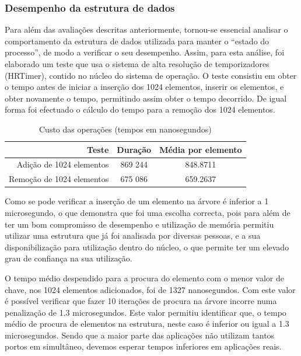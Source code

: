 \documentclass[a4paper]{llncs}
\begin{document}
\subsubsection{Desempenho da estrutura de dados}
Para além das avaliações descritas anteriormente, tornou-se essencial analisar o comportamento da estrutura de dados utilizada para manter o “estado do processo”, de modo a verificar o seu desempenho. 
Assim, para esta análise, foi elaborado um teste que usa o sistema de alta resolução de temporizadores (HRTimer), contido no núcleo do sistema de operação.
O teste consistiu em obter o tempo antes de iniciar a inserção dos 1024 elementos, inserir os elementos, e obter novamente o tempo, permitindo assim obter o tempo decorrido. De igual forma foi efectuado o cálculo do tempo para a remoção dos 1024 elementos.

\begin{table}
\begin{center}

\begin{tabular}{ | r | c | c | }
\hline
\hspace{1cm} Teste \hspace{1.5cm} & \hspace{1cm}Duração\hspace{1cm} &  Média por
elemento \\
\hline
Adição de 1024 elementos & 869 244 & 848.8711 \\
\hline
Remoção de 1024 elementos & 675 086 & 659.2637\\
\hline

\hline
\end{tabular}
\caption{Custo das operações (tempos em nanosegundos)}
\label{tab:tree_info}
\end{center}
\end{table}

Como se pode verificar a inserção de um elemento na árvore é inferior a 1 microsegundo, o que demonstra que foi uma escolha correcta, pois para além de ter um bom compromisso de desempenho e utilização de memória permitiu utilizar uma estrutura que já foi analisada por diversas pessoas, e a sua disponibilização para utilização dentro do núcleo, o que permite ter um elevado grau de confiança na sua utilização.

O tempo médio despendido para a procura do elemento com o menor valor de chave, nos 1024 elementos adicionados, foi de 1327 nanosegundos.
 Com este valor é possível verificar que fazer 10 iterações de procura na árvore incorre numa penalização de 1.3 microsegundos.
 Este valor permitiu identificar que, o tempo médio de procura de elementos na estrutura, neste caso é inferior ou igual a 1.3 microsegundos.
 Sendo que a maior parte das aplicações não utilizam tantos portos em simultâneo, devemos esperar tempos inferiores em aplicações reais.
\end{document}

